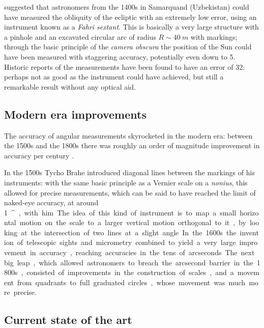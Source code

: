 \documentclass[main.tex]{subfiles}
\begin{document}
\textcite[]{sattarovMainInstrumentUlugh2009} suggested that astronomers from the 1400s in Samarquand (Uzbekistan) could have measured the obliquity of the ecliptic with an extremely low error, using an instrument known as a \emph{Fahri sextant}.
This is basically a very large structure with a pinhole and an excavated circular arc of radius \(R \sim \SI{40}{m}\) with markings; through the basic principle of the \emph{camera obscura} the position of the Sun could have been measured with staggering accuracy, potentially even down to \SI{5}{\arcsec}.
Historic reports of the measurements have been found to have an error of \SI{32}{\arcsec}: perhaps not as good as the instrument could have achieved, but still a remarkable result without any optical aid. 

\subsection{Modern era improvements}

The accuracy of angular measurements skyrocketed in the modern era: between the 1500s and the 1800s there was roughly an order of magnitude improvement in accuracy per century \cite[]{chapmanAccuracyAngularMeasuring1983}.

In the 1500s Tycho Brahe introduced diagonal lines between the markings of his instruments: with the same basic principle as a Vernier scale on a \emph{nonius}, this allowed for precise measurements, which can be said to have reached the limit of naked-eye accuracy, at around \SI{1}{^\prime}, with him. 

The idea of this kind of instrument is to map a small horizontal motion on the scale to a larger vertical motion orthogonal to it, by looking at the intersection of two lines at a slight angle.

In the 1600s the invention of telescopic sights and micrometry combined to yield a very large improvement in accuracy, reaching accuracies in the tens of arcseconds. 

The next big leap, which allowed astronomers to breach the arcsecond barrier in the 1800s, consisted of improvements in the construction of scales, and a movement from quadrants to full graduated circles, whose movement was much more precise. 

\subsection{Current state of the art}
\end{document}

